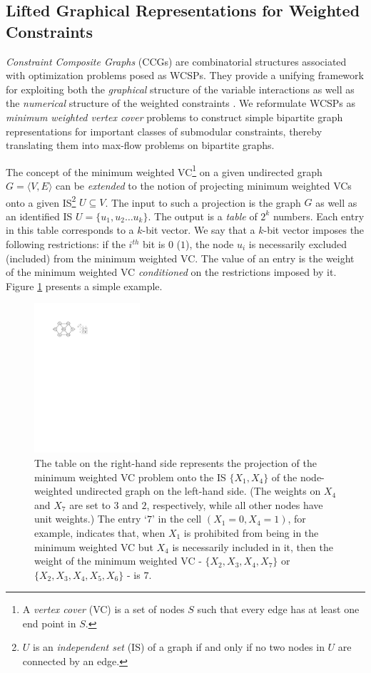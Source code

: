 \subsection{Lifted Graphical Representations for Weighted Constraints}
  \emph{Constraint Composite Graphs} (CCGs) are combinatorial structures associated with optimization problems posed as WCSPs. They provide a unifying framework for exploiting both the \emph{graphical} structure of the variable interactions as well as the \emph{numerical} structure of the weighted constraints \cite{K:CP:08}. We reformulate WCSPs as \emph{minimum weighted vertex cover} problems to construct simple bipartite graph representations for important classes of submodular constraints, thereby translating them into max-flow problems on bipartite graphs.

  The concept of the minimum weighted VC\footnote{A \emph{vertex cover} (VC) is a set of nodes $S$ such that every edge has at least one end point in $S$.} on a given undirected graph $G=\langle V,E \rangle$ can be \emph{extended} to the notion of projecting minimum weighted VCs onto a given IS\footnote{$U$ is an \emph{independent set} (IS) of a graph if and only if no two nodes in $U$ are connected by an edge.} $U \subseteq V$. The input to such a projection is the graph $G$ as well as an identified IS $U=\{u_1, u_2 \ldots u_k\}$. The output is a \emph{table} of $2^k$ numbers. Each entry in this table corresponds to a $k$-bit vector. We say that a $k$-bit vector imposes the following restrictions: if the $i^{th}$ bit is $0$ ($1$), the node $u_i$ is necessarily excluded (included) from the minimum weighted VC. The value of an entry is the weight of the minimum weighted VC \emph{conditioned} on the restrictions imposed by it. Figure \ref{VC_example} presents a simple example.
  
\begin{figure}[t]
  \centering
  \includegraphics[width=0.35\textwidth]{figs/fig5}
  \caption{The table on the right-hand side represents the projection of the minimum weighted VC problem onto the IS $\{ X_1, X_4 \}$ of the node-weighted undirected graph on the left-hand side. (The weights on $X_4$ and $X_7$ are set to $3$ and $2$, respectively, while all other nodes have unit weights.) The entry `$7$' in the cell $(X_1=0, X_4=1)$, for example, indicates that, when $X_1$ is prohibited from being in the minimum weighted VC but $X_4$ is necessarily included in it, then the weight of the minimum weighted VC - $\{ X_2, X_3, X_4, X_7 \}$ or $\{ X_2, X_3, X_4, X_5, X_6 \}$ - is $7$.}
  \label{VC_example}
\end{figure}

